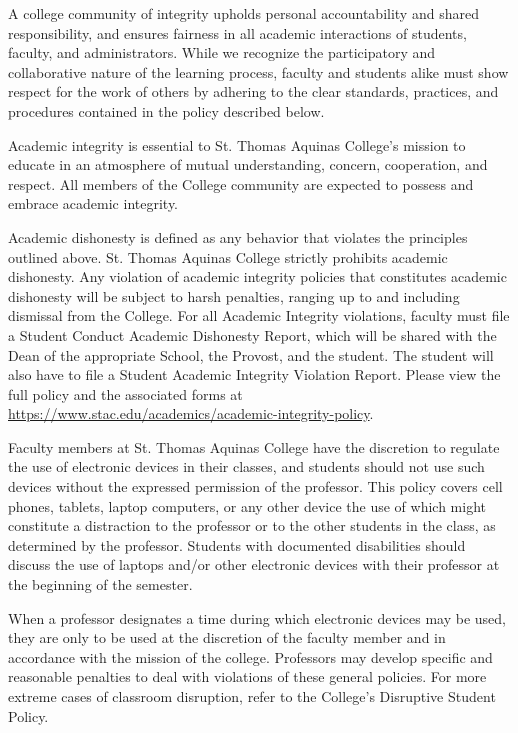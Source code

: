 \documentclass[11pt,letterpaper]{article}
\begin{document}
A college community of integrity upholds personal accountability and shared responsibility, and ensures fairness in all academic interactions of students, faculty, and administrators. While we recognize the participatory and collaborative nature of the learning process, faculty and students alike must show respect for the work of others by adhering to the clear standards, practices, and procedures contained in the policy described below. \pspace

Academic integrity is essential to St. Thomas Aquinas College's mission to educate in an atmosphere of mutual understanding, concern, cooperation, and respect. All members of the College community are expected to possess and embrace academic integrity. 
\sectionbreak




Academic dishonesty is defined as any behavior that violates the principles outlined above. St. Thomas Aquinas College strictly prohibits academic dishonesty. Any violation of academic integrity policies that constitutes academic dishonesty will be subject to harsh penalties, ranging up to and including dismissal from the College. For all Academic Integrity violations, faculty must file a Student Conduct Academic Dishonesty Report, which will be shared with the Dean of the appropriate School, the Provost, and the student. The student will also have to file a Student Academic Integrity Violation Report. Please view the full policy and the associated forms at \url{https://www.stac.edu/academics/academic-integrity-policy}. 
\sectionbreak




Faculty members at St. Thomas Aquinas College have the discretion to regulate the use of electronic devices in their classes, and students should not use such devices without the expressed permission of the professor. This policy covers cell phones, tablets, laptop computers, or any other device the use of which might constitute a distraction to the professor or to the other students in the class, as determined by the professor. Students with documented disabilities should discuss the use of laptops and/or other electronic devices with their professor at the beginning of the semester. \pspace

When a professor designates a time during which electronic devices may be used, they are only to be used at the discretion of the faculty member and in accordance with the mission of the college. Professors may develop specific and reasonable penalties to deal with violations of these general policies. For more extreme cases of classroom disruption, refer to the College's Disruptive Student Policy. \pspace
\end{document}
